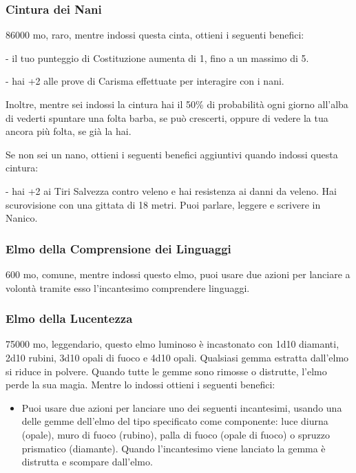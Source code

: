 \begin{multicols}{2}
	\subsubsection*{Cintura dei Nani}
	86000 mo, raro, mentre indossi questa cinta, ottieni i seguenti benefici:

	- il tuo punteggio di Costituzione aumenta di 1, fino a un massimo di 5.

	- hai +2 alle prove di Carisma effettuate per interagire con i nani.

	Inoltre, mentre sei indossi la cintura hai il 50\% di probabilità ogni giorno all'alba di vederti spuntare una folta barba, se può crescerti, oppure di vedere la tua ancora più folta, se già la hai.

	Se non sei un nano, ottieni i seguenti benefici aggiuntivi quando indossi questa cintura:

	- hai +2 ai Tiri Salvezza contro veleno e hai resistenza ai danni da veleno. Hai scurovisione con una gittata di 18 metri. Puoi parlare, leggere e scrivere in Nanico.

	\subsubsection*{Elmo della Comprensione dei Linguaggi}
	600 mo, comune, mentre indossi questo elmo, puoi usare due azioni per lanciare a volontà tramite esso l'incantesimo comprendere linguaggi.

	\subsubsection*{Elmo della Lucentezza}
	75000 mo, leggendario, questo elmo luminoso è incastonato con 1d10 diamanti, 2d10 rubini, 3d10 opali di fuoco e 4d10 opali. Qualsiasi gemma estratta dall'elmo si riduce in polvere. Quando tutte le gemme sono rimosse o distrutte, l'elmo perde la sua magia. Mentre lo indossi ottieni i seguenti benefici:

	\medskip

	\begin{itemize}
		\item
		Puoi usare due azioni per lanciare uno dei seguenti incantesimi, usando una delle gemme dell'elmo del tipo specificato come componente: luce diurna (opale), muro di fuoco (rubino), palla di fuoco (opale di fuoco) o spruzzo prismatico (diamante). Quando l'incantesimo viene lanciato la gemma è distrutta e scompare dall'elmo.


\end{itemize}
\end{multicols}
